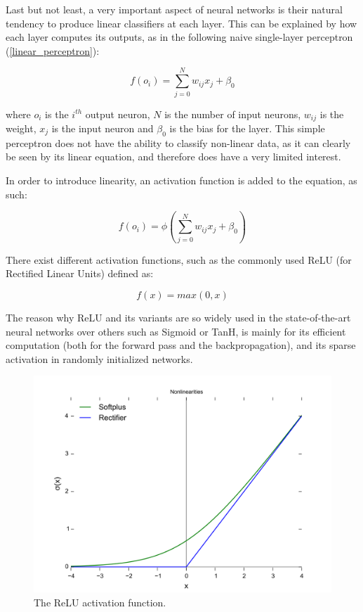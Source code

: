 Last but not least, a very important aspect of neural networks is their
natural tendency to produce linear classifiers at each layer. This can be
explained by how each layer computes its outputs, as in the following naive
single-layer perceptron (\ref{linear_perceptron}):

\begin{equation} \label{linear_perceptron}
	f(o_i) = \displaystyle\sum_{j=0}^{N} w_{ij}x_j+\beta_0
\end{equation}


where $o_i$ is the $i^{th}$ output neuron, $N$ is the number of input neurons,
$w_{ij}$ is the weight, $x_j$ is the input neuron and $\beta_0$ is the bias for
the layer. This simple perceptron does not have the ability to classify
non-linear data, as it can clearly be seen by its linear equation, and
therefore does have a very limited interest.

In order to introduce linearity, an activation function is added to the
equation, as such:

\begin{equation} \label{nonlinear_perceptron}
	f(o_i) = \phi(\displaystyle\sum_{j=0}^{N} w_{ij}x_j+\beta_0)
\end{equation}

There exist different activation functions, such as the commonly used ReLU (for
Rectified Linear Units) defined as:

\begin{equation} \label{relu}
	f(x) = max(0, x)
\end{equation}

The reason why ReLU and its variants are so widely used in the state-of-the-art
neural networks over others such as Sigmoid or TanH, is mainly for its
efficient computation (both for the forward pass and the backpropagation), and
its sparse activation in randomly initialized networks.

\begin{figure}[h]
	\center
	\includegraphics[width=0.4\linewidth]{figure/relu.png}
	\caption{The ReLU activation function.}
\end{figure}

